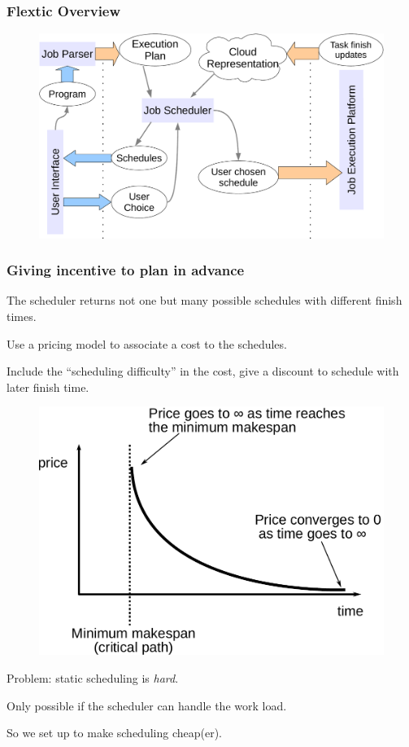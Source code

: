 \documentclass{beamer}
\newcommand{\flex}{\textsf{Flextic}\xspace}
\begin{document}
\begin{frame}
  \frametitle{\flex Overview}
  \begin{figure}
    \includegraphics[scale=0.4]{overview}
  \end{figure}
\end{frame}

\begin{frame}
  \frametitle{Giving incentive to plan in advance}

  The scheduler returns not one but many possible schedules with different finish times.

  Use a pricing model to associate a cost to the schedules.

  Include the ``scheduling difficulty'' in the cost, give a discount to schedule with later finish time.

  \begin{figure}
    \includegraphics[scale=0.3]{price_curve}
  \end{figure}

  Problem: static scheduling is \emph{hard}.

  Only possible if the scheduler can handle the work load.

  So we set up to make scheduling cheap(er).
  
\end{frame}
\end{document}
